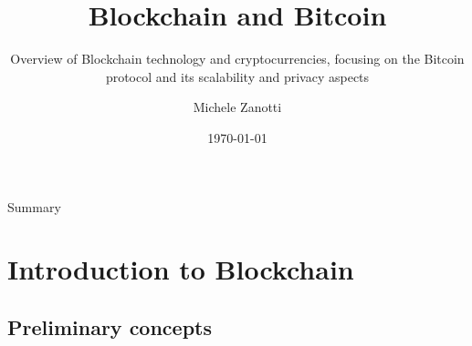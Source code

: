 \documentclass{beamer}
\title{Blockchain and Bitcoin}
\subtitle[]{Overview of Blockchain technology and cryptocurrencies, focusing on
the Bitcoin protocol and its scalability and privacy aspects}
\institute[]{Università degli studi di Brescia}
\author{Michele Zanotti}
\date{\today}
\begin{document}
  \begin{frame}
    \titlepage
  \end{frame}
  \begin{frame}{Summary}
    \frametitle{\contentsname}
    \begin{multicols}{2}
        \tableofcontents
    \end{multicols}
  \end{frame}





  \section{Introduction to Blockchain}
  \subsection{Preliminary concepts}





\end{document}
